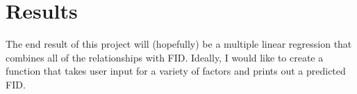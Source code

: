 \documentclass{article}
\begin{document}







\section{Results}
\hspace{1cm}The end result of this project will (hopefully) be a multiple linear regression that combines all of the relationships with FID. Ideally, I would like to create a function that takes user input for a variety of factors and prints out a predicted FID.

\newpage


\end{document}
